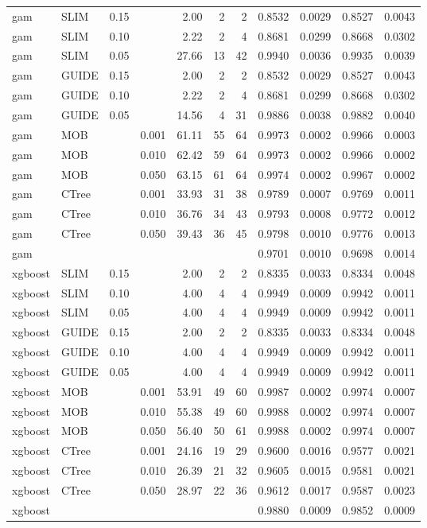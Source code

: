 \begin{table}[!htb]
\begin{tabular}[t]{l|l|r|r|r|r|r|r|r|r|r}
\hline
gam & SLIM & 0.15 & & 2.00 & 2 & 2 & 0.8532 & 0.0029 & 0.8527 & 0.0043\\
gam & SLIM & 0.10 & & 2.22 & 2 & 4 & 0.8681 & 0.0299 & 0.8668 & 0.0302\\
gam & SLIM & 0.05 & & 27.66 & 13 & 42 & 0.9940 & 0.0036 & 0.9935 & 0.0039\\
gam & GUIDE & 0.15 & & 2.00 & 2 & 2 & 0.8532 & 0.0029 & 0.8527 & 0.0043\\
gam & GUIDE & 0.10 & & 2.22 & 2 & 4 & 0.8681 & 0.0299 & 0.8668 & 0.0302\\
gam & GUIDE & 0.05 & & 14.56 & 4 & 31 & 0.9886 & 0.0038 & 0.9882 & 0.0040\\
gam & MOB & & 0.001 & 61.11 & 55 & 64 & 0.9973 & 0.0002 & 0.9966 & 0.0003\\
gam & MOB & & 0.010 & 62.42 & 59 & 64 & 0.9973 & 0.0002 & 0.9966 & 0.0002\\
gam & MOB & & 0.050 & 63.15 & 61 & 64 & 0.9974 & 0.0002 & 0.9967 & 0.0002\\
gam & CTree & & 0.001 & 33.93 & 31 & 38 & 0.9789 & 0.0007 & 0.9769 & 0.0011\\
gam & CTree & & 0.010 & 36.76 & 34 & 43 & 0.9793 & 0.0008 & 0.9772 & 0.0012\\
gam & CTree & & 0.050 & 39.43 & 36 & 45 & 0.9798 & 0.0010 & 0.9776 & 0.0013\\

\hline
gam & & & & & & & 0.9701 & 0.0010 & 0.9698 & 0.0014\\
\hline

xgboost & SLIM & 0.15 & & 2.00 & 2 & 2 & 0.8335 & 0.0033 & 0.8334 & 0.0048\\
xgboost & SLIM & 0.10 & & 4.00 & 4 & 4 & 0.9949 & 0.0009 & 0.9942 & 0.0011\\
xgboost & SLIM & 0.05 & & 4.00 & 4 & 4 & 0.9949 & 0.0009 & 0.9942 & 0.0011\\
xgboost & GUIDE & 0.15 & & 2.00 & 2 & 2 & 0.8335 & 0.0033 & 0.8334 & 0.0048\\
xgboost & GUIDE & 0.10 & & 4.00 & 4 & 4 & 0.9949 & 0.0009 & 0.9942 & 0.0011\\
xgboost & GUIDE & 0.05 & & 4.00 & 4 & 4 & 0.9949 & 0.0009 & 0.9942 & 0.0011\\
xgboost & MOB & & 0.001 & 53.91 & 49 & 60 & 0.9987 & 0.0002 & 0.9974 & 0.0007\\
xgboost & MOB & & 0.010 & 55.38 & 49 & 60 & 0.9988 & 0.0002 & 0.9974 & 0.0007\\
xgboost & MOB & & 0.050 & 56.40 & 50 & 61 & 0.9988 & 0.0002 & 0.9974 & 0.0007\\
xgboost & CTree & & 0.001 & 24.16 & 19 & 29 & 0.9600 & 0.0016 & 0.9577 & 0.0021\\
xgboost & CTree &  & 0.010 & 26.39 & 21 & 32 & 0.9605 & 0.0015 & 0.9581 & 0.0021\\
xgboost & CTree & & 0.050 & 28.97 & 22 & 36 & 0.9612 & 0.0017 & 0.9587 & 0.0023\\
\hline
xgboost & & & & & & & 0.9880 & 0.0009 & 0.9852 & 0.0009\\
\hline


\end{tabular}
\end{table}
